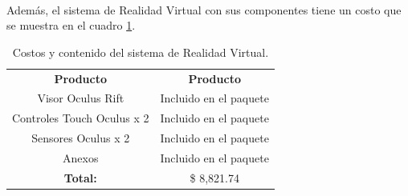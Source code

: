 \textbf{}\\
Además, el sistema de Realidad Virtual con sus componentes tiene un costo que se muestra en el cuadro \ref{tab:t27}.
\begin{table}[H]
  \centering
  \begin{tabular}{|c|c|}
  \hline
  \rowcolor[HTML]{9B9B9B} 
  \multicolumn{2}{|c|}{\cellcolor[HTML]{9B9B9B}\textbf{Sistema de Realidad Virtual}} \\ \hline
  \rowcolor[HTML]{9B9B9B} 
  \textbf{Producto}                          & \textbf{Producto}                     \\ \hline
  Visor Oculus Rift                          & Incluido en el paquete                \\ \hline
  Controles Touch Oculus x 2                 & Incluido en el paquete                \\ \hline
  Sensores Oculus x 2                        & Incluido en el paquete                \\ \hline
  Anexos                                     & Incluido en el paquete                \\ \hline
  \textbf{Total:}                            & \$ 8,821.74                           \\ \hline
  \end{tabular}
  \caption{Costos y contenido del sistema de Realidad Virtual.}
  \label{tab:t27}
\end{table}

